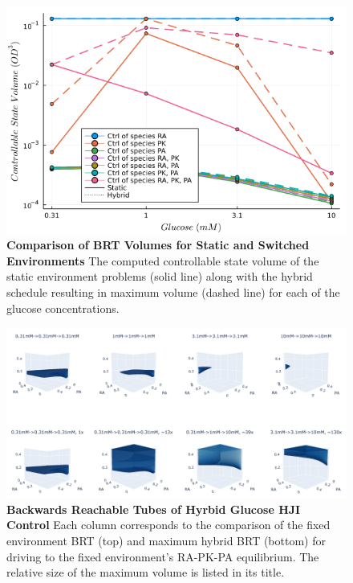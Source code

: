 \documentclass[twocolumn, 10pt]{report}
\begin{document}
{\begin{figure}[!ht]
    \centering
    \includegraphics[width=1.0\columnwidth]{figs/BRT_comp.png}
    \centering
    \caption{\textbf{Comparison of BRT Volumes for Static and Switched Environments} The computed controllable state volume of the static environment problems (solid line) along with the hybrid schedule resulting in maximum volume (dashed line) for each of the glucose concentrations. }\label{fig:hs_vr}
\end{figure}

\begin{figure}[!ht]
    \centering
    \includegraphics[width=2.0\columnwidth]{figs/all_BRT.png}
    \centering
    \caption{\textbf{Backwards Reachable Tubes of Hyrbid Glucose HJI Control} Each column corresponds to the comparison of the fixed environment BRT (top) and maximum hybrid BRT (bottom) for driving to the fixed environment's RA-PK-PA equilibrium. The relative size of the maximum volume is listed in its title. }\label{fig:hs}
\end{figure}

}
\end{document}
